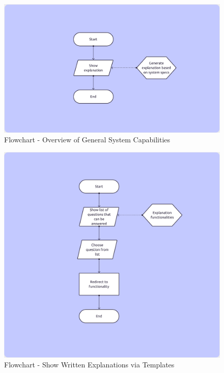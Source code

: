 \begin{figure}[htbp]
    \centering
    \includegraphics[width=\textwidth]{img/figures/flowcharts/overview.png}
    \caption{Flowchart - Overview of General System Capabilities}
    \label{figure:flowchart_overview}
\end{figure}
\begin{figure}[htbp]
    \centering
    \includegraphics[width=\textwidth]{img/figures/flowcharts/written_explanations.png}
    \caption{Flowchart - Show Written Explanations via Templates}
    \label{figure:flowchart_written_explanations}
\end{figure}
